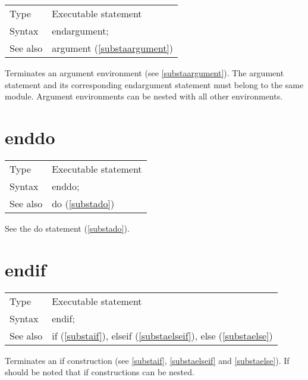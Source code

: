 \noindent \begin{tabular}{ll}
Type & Executable statement\\
Syntax & endargument; \\
See also & argument (\ref{substaargument})
\end{tabular} \vspace{4mm}

\noindent Terminates an argument environment 
(see \ref{substaargument}). The argument statement and its 
corresponding endargument statement must belong to the 
same module. Argument environments can be nested with all other 
environments. \vspace{10mm}


\section{enddo}
\label{substaenddo}

\noindent \begin{tabular}{ll}
Type & Executable statement\\
Syntax & enddo;
\\ See also & do (\ref{substado})
\end{tabular} \vspace{4mm}

See the do statement (\ref{substado}).
\vspace{10mm}


\section{endif}
\label{substaendif}

\noindent \begin{tabular}{ll}
Type & Executable statement\\
Syntax & endif;
\\ See also & if (\ref{substaif}),
              elseif (\ref{substaelseif}),
              else (\ref{substaelse})
\end{tabular} \vspace{4mm}

\noindent Terminates an if construction (see \ref{substaif}, 
\ref{substaelseif} and \ref{substaelse}). If should be noted that 
if 
constructions can be nested.
\vspace{10mm}

